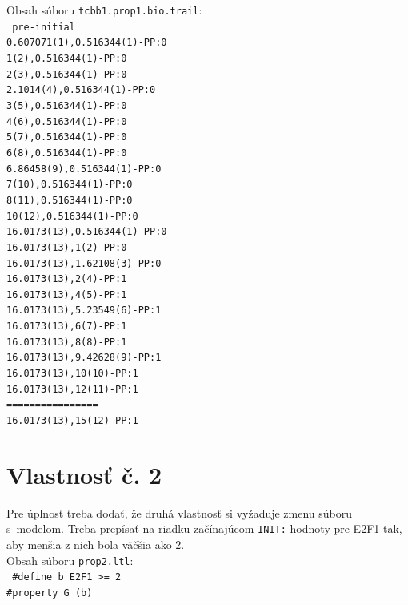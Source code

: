 \documentclass[11pt,final,oneside]{fithesis}
\begin{document}
\noindent
Obsah s\'uboru {\tt tcbb1.prop1.bio.trail}:\\

{\tt\noindent
pre-initial\\
0.607071(1),0.516344(1)-PP:0\\
1(2),0.516344(1)-PP:0\\
2(3),0.516344(1)-PP:0\\
2.1014(4),0.516344(1)-PP:0\\
3(5),0.516344(1)-PP:0\\
4(6),0.516344(1)-PP:0\\
5(7),0.516344(1)-PP:0\\
6(8),0.516344(1)-PP:0\\
6.86458(9),0.516344(1)-PP:0\\
7(10),0.516344(1)-PP:0\\
8(11),0.516344(1)-PP:0\\
10(12),0.516344(1)-PP:0\\
16.0173(13),0.516344(1)-PP:0\\
16.0173(13),1(2)-PP:0\\
16.0173(13),1.62108(3)-PP:0\\
16.0173(13),2(4)-PP:1\\
16.0173(13),4(5)-PP:1\\
16.0173(13),5.23549(6)-PP:1\\
16.0173(13),6(7)-PP:1\\
16.0173(13),8(8)-PP:1\\
16.0173(13),9.42628(9)-PP:1\\
16.0173(13),10(10)-PP:1\\
16.0173(13),12(11)-PP:1\\
================\\
16.0173(13),15(12)-PP:1\\
}


\chapter{Vlastnos\v t \v c. 2}
\label{sec:caseProp2File}
Pre \'uplnos\v t treba doda\v t, \v ze druh\'a vlastnos\v t si vy\v zaduje zmenu s\'uboru s~modelom. Treba prep\'isa\v t na riadku za\v c\'inaj\'ucom 
{\tt INIT:} hodnoty pre {E2F1} tak, aby men\v sia z nich bola v\"a\v c\v sia ako 2.\\

\noindent
Obsah s\'uboru {\tt prop2.ltl}:\\

{\tt
\noindent
\#define b E2F1 >= 2\\

\noindent
\#property G (b)\\
}
\end{document}
